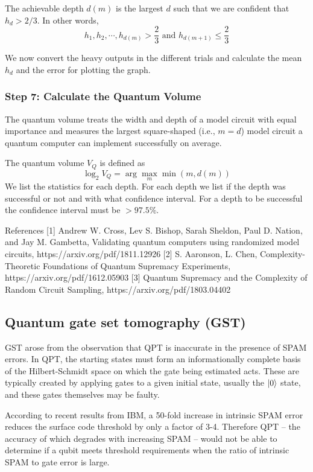 \documentclass[11pt, oneside]{article}   	%
\begin{document}
The achievable depth $d(m)$ is the largest $d$ such that we are confident that $h_d > 2/3$. 
In other words, 
\begin{equation}
h_1, h_2,\cdots,h_{d(m)} > \frac{2}{3} \text{ and } h_{d(m+1)} \leq \frac{2}{3}
\end{equation}

We now convert the heavy outputs in the different trials and calculate the mean $h_d$ and the error for plotting the graph.

\subsubsection{Step 7: Calculate the Quantum Volume}
The quantum volume treats the width and depth of a model circuit with equal importance and measures the largest square-shaped (i.e., $m = d$) model circuit a quantum computer can implement successfully on average.

The quantum volume $V_Q$ is defined as 
\begin{equation}
\log_2 V_Q = \arg\max_{m} \min (m, d(m))
\end{equation}
We list the statistics for each depth. 
For each depth we list if the depth was successful or not and with what confidence interval. For a depth to be successful the confidence interval must be $> 97.5 \%$.

References
[1] Andrew W. Cross, Lev S. Bishop, Sarah Sheldon, Paul D. Nation, and Jay M. Gambetta, Validating quantum computers using randomized model circuits, https://arxiv.org/pdf/1811.12926
[2] S. Aaronson, L. Chen, Complexity-Theoretic Foundations of Quantum Supremacy Experiments, https://arxiv.org/pdf/1612.05903
[3] Quantum Supremacy and the Complexity of Random Circuit Sampling, https://arxiv.org/pdf/1803.04402

\subsection{Quantum gate set tomography (GST)}

GST arose from the observation that QPT is inaccurate in the presence of SPAM errors. 
In QPT, the starting states must form an informationally complete basis of the Hilbert-Schmidt space on which the gate being estimated acts. 
These are typically created by applying gates to a given initial state, usually the $\ket{0}$ state, and these gates themselves may be faulty.

According to recent results from IBM, a 50-fold increase in intrinsic SPAM error reduces the surface code threshold by only a factor of 3-4. 
Therefore QPT -- the accuracy of which degrades with increasing SPAM -- would not be able to determine if a qubit meets threshold requirements when the ratio of intrinsic SPAM to gate error is large.
\end{document}
